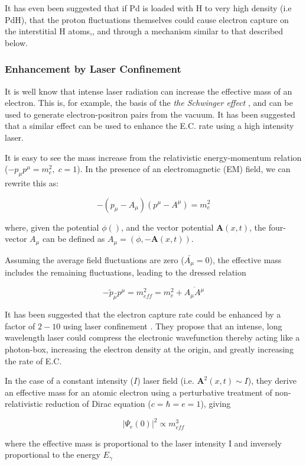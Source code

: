 \documentclass[%
 aip,
 jmp,%
 amsmath,amssymb,
 reprint,%
]{revtex4-1}
\begin{document}
It has even been suggested that if Pd is loaded with H to very high density (i.e PdH), that the proton fluctuations themselves could cause electron capture
on the interstitial H atoms,\cite{widomlarsen2005},  and through a mechanism similar to that described below.

\subsubsection{Enhancement by Laser Confinement}
It is well know that intense laser radiation can increase the effective mass of an electron.  This is, for example, the basis of the 
\emph{the Schwinger effect }, and can be used to generate electron-positron pairs from the vacuum.\cite{PhysRev82664}
It has been suggested that a similar effect can be used to enhance the E.C. rate using a high intensity laser. \cite{sato}

It is easy to see the mass increase from the relativistic energy-momentum relation ($-p_{\mu}p^{\mu}=m_{e}^{2},\;c=1$).  
In the presence of an electromagnetic (EM) field, we can rewrite this as:

$$-(p_{\mu}-A_{\mu})(p^{\mu}-A^{\mu})=m_{e}^{2}$$

where, given the potential $\phi()$, and the vector potential $\mathbf{A}(x,t)$,  the four-vector $A_{\mu}$ can be defined as $A_{\mu}=(\phi, -\mathbf{A}(x,t))$.

Assuming the average field fluctuations are zero ($\bar{A_{\mu}}=0$), the effective mass includes the remaining fluctuations, leading to the dressed relation

$$-\tilde{p}_{\mu}\tilde{}p^{\mu}=m_{eff}^{2}=m_{e}^{2}+\overline{A_{\mu}A^{\mu}}$$

It has been suggested that the electron capture rate could be enhanced by a factor of $2-10$ using laser confinement \cite{sato}.
They propose that an intense, long wavelength laser could compress the electronic wavefunction thereby acting like a photon-box,
increasing the electron density at the origin, and greatly increasing the rate of E.C.  

In the case of a constant intensity ($I$) laser field  (i.e. $\mathbf{A}^{2}(x,t)\sim I$),  they derive an effective mass for an atomic electron using a 
perturbative treatment of non-relativistic reduction of Dirac equation ($c=\hbar=e=1$), giving

$$\big\vert\Psi_{e}(0)\big\vert^{2}\propto m_{eff}^{3}$$

where the effective mass is proportional to the laser intensity I and inversely proportional to the energy $E_{\gamma}$
\end{document}
